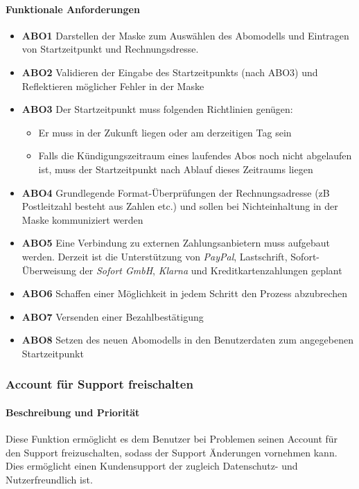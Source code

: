 \paragraph{Funktionale Anforderungen}
\begin{itemize}
	\item \textbf{ABO1} Darstellen der Maske zum Auswählen des Abomodells und Eintragen von Startzeitpunkt und Rechnungsdresse.
	\item \textbf{ABO2} Validieren der Eingabe des Startzeitpunkts (nach ABO3) und Reflektieren möglicher Fehler in der Maske
	\item \textbf{ABO3} Der Startzeitpunkt muss folgenden Richtlinien genügen:
	      \begin{itemize}
		      \item Er muss in der Zukunft liegen oder am derzeitigen Tag sein
		      \item Falls die Kündigungszeitraum eines laufendes Abos noch nicht abgelaufen ist, muss der Startzeitpunkt nach Ablauf dieses Zeitraums liegen
	      \end{itemize}
	\item \textbf{ABO4} Grundlegende Format-Überprüfungen der Rechnungsadresse (zB Postleitzahl besteht aus Zahlen etc.) und sollen bei Nichteinhaltung in der Maske kommuniziert werden
	\item \textbf{ABO5} Eine Verbindung zu externen Zahlungsanbietern muss aufgebaut werden. Derzeit ist die Unterstützung von \textit{PayPal}, Lastschrift, Sofort-Überweisung der \textit{Sofort GmbH}, \textit{Klarna} und Kreditkartenzahlungen geplant %
	\item \textbf{ABO6} Schaffen einer Möglichkeit in jedem Schritt den Prozess abzubrechen
	\item \textbf{ABO7} Versenden einer Bezahlbestätigung
	\item \textbf{ABO8} Setzen des neuen Abomodells in den Benutzerdaten zum angegebenen Startzeitpunkt
\end{itemize}

\subsubsection{Account für Support freischalten}
\label{sys_feat:freischalten}
\paragraph{Beschreibung und Priorität}
Diese Funktion ermöglicht es dem Benutzer bei Problemen seinen Account für den Support freizuschalten, sodass der Support Änderungen vornehmen kann. Dies ermöglicht einen Kundensupport der zugleich Datenschutz- und Nutzerfreundlich ist.

